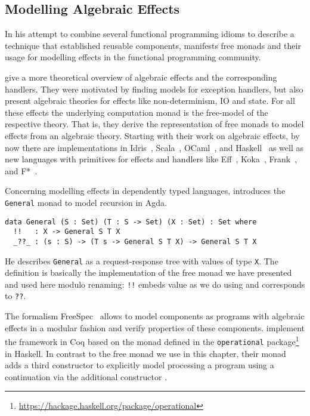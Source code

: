 \subsection{Modelling Algebraic Effects}

In his attempt to combine several functional programming idioms to describe a technique that established reusable components, \citet{swierstra2008data} manifests free monads and their usage for modelling effects in the functional programming community.

\citet{plotkin2009handlers} give a more theoretical overview of algebraic effects and the corresponding handlers.
They were motivated by finding models for exception handlers, but also present algebraic theories for effects like non\--determinism, IO and state.
For all these effects the underlying computation monad is the free\--model of the respective theory.
That is, they derive the representation of free monads to model effects from an algebraic theory.
Starting with their work on algebraic effects, by now there are implementations in Idris~\citep{brady2013programming}, Scala~\citep{brachthauser2017effekt}, OCaml~\citep{kiselyov2016eff}, and Haskell~\citep{kiselyov2015freer,kammar2013handlers} as well as new languages with primitives for effects and handlers like Eff~\citep{pretnar2015introduction}, Koka~\citep{leijen2016algebraic}, Frank~\citep{lindley2017be}, and F*~\citep{swamy2016dependent}.

Concerning modelling effects in dependently typed languages, \citet{mcbride2015turingcompleteness} introduces the \texttt{General} monad to model recursion in Agda.

\begin{verbatim}
data General (S : Set) (T : S -> Set) (X : Set) : Set where
  !!   : X -> General S T X
  _??_ : (s : S) -> (T s -> General S T X) -> General S T X
\end{verbatim}

He describes \texttt{General} as a request\--response tree with values of type \texttt{X}.
The definition is basically the implementation of the free monad we have presented and used here modulo renaming: \texttt{!!} embeds value as we do using  and  corresponds to \texttt{??}.

The formalism FreeSpec~\citep{letan2018modular} allows to model components as programs with algebraic effects in a modular fashion and verify properties of these components.
\citeauthor{letan2018modular} implement the framework in Coq based on the  monad defined in the \texttt{operational} package\footnote{\url{https://hackage.haskell.org/package/operational}} in Haskell.
In contrast to the free monad we use in this chapter, their  monad adds a third constructor to explicitly model processing a program using a continuation via the additional constructor .

